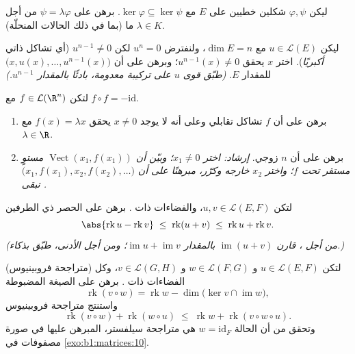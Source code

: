 \begin{exercise}[$\star\star$]\label{exo:b1:linmaps:8}
ليكن $\varphi, \psi$ شكلين خطيين على $E$ مع $\ker\varphi
\subseteq \ker\psi$. برهن على $\psi = \lambda\varphi$ من أجل
$\lambda \in K$ ما (بما في ذلك الحالات المنحلّة).
\end{exercise}

\begin{exercise}[$\star\star\star$]\label{exo:b1:linmaps:9}
ليكن $u \in \mathcal{L}(E)$ مع $\dim E = n$، ولنفترض $u^n = 0$
لكن $u^{n-1} \neq 0$ (أي تشاكل ذاتي \emph{ أكبريًا}).
اختر $x$ يحقق $u^{n-1}(x) \neq 0$؛ وبرهن على أن $\bigl(x, u(x), \dots,
u^{n-1}(x)\bigr)$  للمقدار $E$. \emph{(طبّق قوى $u$ على
تركيبة معدومة، بادئًا بالمقدار $u^{n-1}$.)}
\end{exercise}

\begin{exercise}[$\star\star\star$]\label{exo:b1:linmaps:10}
لتكن $f \in \mathcal{L}(\R^n)$ مع $f \circ f = -\mathrm{id}$.
\begin{enumerate}
  \item برهن على أن $f$ تشاكل تقابلي وعلى أنه لا يوجد $x \neq 0$
        يحقق $f(x) = \lambda x$ مع $\lambda \in \R$.
  \item برهن على أن $n$ زوجي. \emph{إرشاد: اختر $x_1 \neq 0$؛ وبيّن
        أن $\operatorname{Vect}(x_1, f(x_1))$ مستوٍ مستقر تحت
        $f$؛ واختر $x_2$ خارجه وكرّر، مبرهنًا على أن
        $\bigl(x_1, f(x_1), x_2, f(x_2), \dots\bigr)$ تبقى .}
\end{enumerate}
\end{exercise}

\begin{exercise}[$\star\star$]\label{exo:b1:linmaps:11}
لتكن $u, v \in \mathcal{L}(E, F)$، والفضاءات ذات .
برهن على الحصر ذي الطرفين
\[
\abs{\operatorname{rk} u - \operatorname{rk} v}
\;\leq\; \operatorname{rk}(u + v)
\;\leq\; \operatorname{rk} u + \operatorname{rk} v .
\]
\emph{(من أجل ، قارن $\operatorname{im}(u+v)$ بالمقدار
$\operatorname{im} u + \operatorname{im} v$؛ ومن أجل الأدنى،
طبّق  بذكاء.)}
\end{exercise}

\begin{exercise}[$\star\star\star$]\label{exo:b1:linmaps:12}
(متراجحة فروبينيوس) لتكن $u \in \mathcal{L}(E, F)$ و $w \in
\mathcal{L}(F, G)$ و $v \in \mathcal{L}(G, H)$، وكل الفضاءات
ذات . برهن على الصيغة المضبوطة
\[
\operatorname{rk}(v \circ w) = \operatorname{rk} w -
\dim\bigl(\ker v \cap \operatorname{im} w\bigr),
\]
واستنتج متراجحة فروبينيوس
\[
\operatorname{rk}(v \circ w) + \operatorname{rk}(w \circ u)
\;\leq\; \operatorname{rk} w + \operatorname{rk}(v \circ w \circ
u) .
\]
وتحقق من أن الحالة $w = \mathrm{id}_F$ هي متراجحة
سيلفستر، المبرهن عليها في صورة مصفوفات في \cref{exo:b1:matrices:10}.
\end{exercise}

